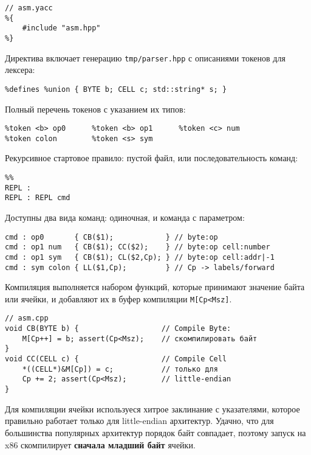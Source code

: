 \clearpage
{}

\begin{verbatim}// asm.yacc
%{
    #include "asm.hpp"
%}
\end{verbatim}
Директива включает генерацию \verb|tmp/parser.hpp| с описаниями токенов для лексера:
\begin{verbatim}
%defines %union { BYTE b; CELL c; std::string* s; }
\end{verbatim}
\noindent
Полный перечень токенов с указанием их типов:
\begin{verbatim}
%token <b> op0      %token <b> op1      %token <c> num
%token colon        %token <s> sym
\end{verbatim}
Рекурсивное стартовое правило: пустой файл, или последовательность команд:
\begin{verbatim}
%%
REPL :
REPL : REPL cmd
\end{verbatim}
Доступны два вида команд: одиночная, и команда с параметром:
\begin{verbatim}
cmd : op0       { CB($1);            } // byte:op
cmd : op1 num   { CB($1); CC($2);    } // byte:op cell:number
cmd : op1 sym   { CB($1); CL($2,Cp); } // byte:op cell:addr|-1
cmd : sym colon { LL($1,Cp);         } // Cp -> labels/forward
\end{verbatim}
Компиляция выполняется набором функций, которые принимают значение байта или
ячейки, и добавляют их в буфер компиляции \verb|M[Cp<Msz]|.

\clearpage
\begin{verbatim}// asm.cpp
void CB(BYTE b) {                   // Compile Byte:
    M[Cp++] = b; assert(Cp<Msz);    // скомпилировать байт
}
void CC(CELL c) {                   // Compile Cell
    *((CELL*)&M[Cp]) = c;           // только для
    Cp += 2; assert(Cp<Msz);        // little-endian
}
\end{verbatim}
Для компиляции ячейки используеся хитрое заклинание с указателями, которое
правильно работает только для little-endian архитектур. Удачно, что для
большинства популярных архитектур порядок байт совпадает, поэтому запуск на x86
скомпилирует \textbf{сначала младший байт} ячейки.
